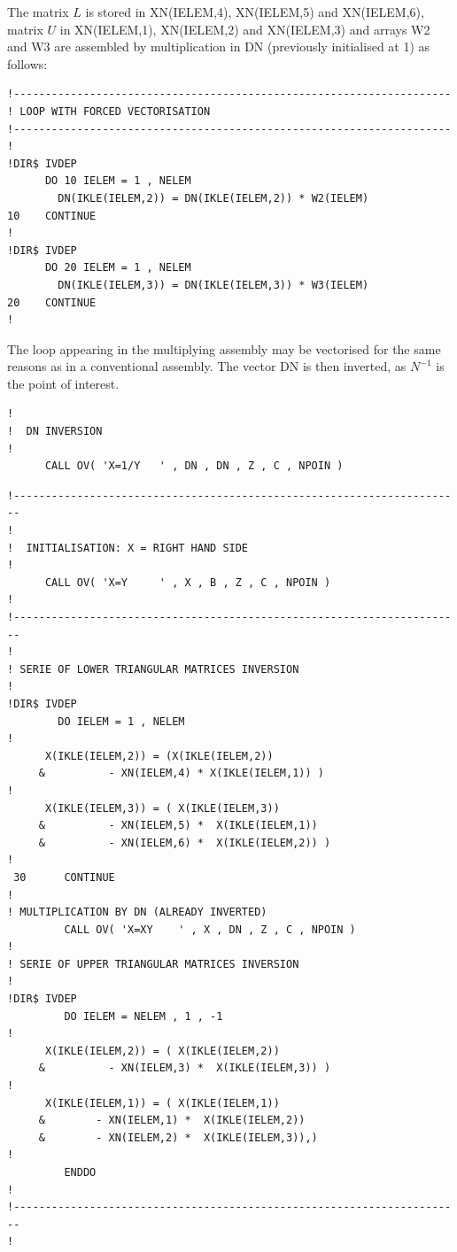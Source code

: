 The matrix $L$ is stored in XN(IELEM,4), XN(IELEM,5) and XN(IELEM,6), matrix $U$ in
XN(IELEM,1), XN(IELEM,2) and XN(IELEM,3) and arrays W2 and W3 are assembled by
multiplication in DN (previously initialised at 1) as follows:

\begin{lstlisting}[language=TelFortran]
!---------------------------------------------------------------------
! LOOP WITH FORCED VECTORISATION
!---------------------------------------------------------------------
!
!DIR$ IVDEP
      DO 10 IELEM = 1 , NELEM
        DN(IKLE(IELEM,2)) = DN(IKLE(IELEM,2)) * W2(IELEM)
10    CONTINUE
!
!DIR$ IVDEP
      DO 20 IELEM = 1 , NELEM
        DN(IKLE(IELEM,3)) = DN(IKLE(IELEM,3)) * W3(IELEM)
20    CONTINUE
!
\end{lstlisting}

The loop appearing in the multiplying assembly may be vectorised for the same
reasons as in a conventional assembly.
The vector DN is then inverted, as $N^{-1}$ is the point of interest.

\begin{lstlisting}[language=TelFortran]
!
!  DN INVERSION
!
      CALL OV( 'X=1/Y   ' , DN , DN , Z , C , NPOIN )
\end{lstlisting}


\begin{lstlisting}[language=TelFortran]
!-----------------------------------------------------------------------
!
!  INITIALISATION: X = RIGHT HAND SIDE
!
      CALL OV( 'X=Y     ' , X , B , Z , C , NPOIN )
!
!-----------------------------------------------------------------------
!
! SERIE OF LOWER TRIANGULAR MATRICES INVERSION
!
!DIR$ IVDEP
        DO IELEM = 1 , NELEM
!
      X(IKLE(IELEM,2)) = (X(IKLE(IELEM,2))
     &          - XN(IELEM,4) * X(IKLE(IELEM,1)) )
!
      X(IKLE(IELEM,3)) = ( X(IKLE(IELEM,3))
     &          - XN(IELEM,5) *  X(IKLE(IELEM,1))
     &          - XN(IELEM,6) *  X(IKLE(IELEM,2)) )
!
 30      CONTINUE
!
! MULTIPLICATION BY DN (ALREADY INVERTED)
         CALL OV( 'X=XY    ' , X , DN , Z , C , NPOIN )
!
! SERIE OF UPPER TRIANGULAR MATRICES INVERSION
!
!DIR$ IVDEP
         DO IELEM = NELEM , 1 , -1
!
      X(IKLE(IELEM,2)) = ( X(IKLE(IELEM,2))
     &          - XN(IELEM,3) *  X(IKLE(IELEM,3)) )
!
      X(IKLE(IELEM,1)) = ( X(IKLE(IELEM,1))
     &        - XN(IELEM,1) *  X(IKLE(IELEM,2))
     &        - XN(IELEM,2) *  X(IKLE(IELEM,3)),)
!
         ENDDO
!
!-----------------------------------------------------------------------
!
\end{lstlisting}

